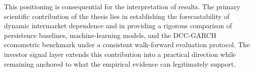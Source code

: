 This positioning is consequential for the interpretation of results. The primary scientific contribution of the thesis lies in establishing the forecastability of dynamic intermarket dependence and in providing a rigorous comparison of persistence baselines, machine-learning models, and the DCC-GARCH econometric benchmark under a consistent walk-forward evaluation protocol. The investor signal layer extends this contribution into a practical direction while remaining anchored to what the empirical evidence can legitimately support.
